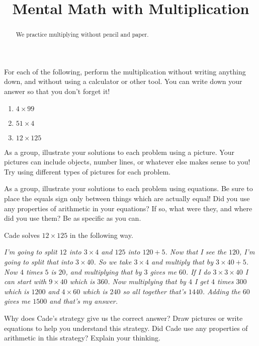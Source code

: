 \documentclass{ximera}
\title{Mental Math with Multiplication}
\begin{document}
\begin{abstract} We practice multiplying without pencil and paper. \end{abstract}
\maketitle


\begin{problem}
For each of the following, perform the multiplication without writing anything down, and without using a calculator or other tool. You can write down your answer so that you don't forget it!

\begin{enumerate}
\item $4 \times 99$
\item $51 \times 4$
\item $12 \times 125$

\end{enumerate}

\end{problem}


\begin{problem}
As a group, illustrate your solutions to each problem using a picture. Your pictures can include objects, number lines, or whatever else makes sense to you! Try using different types of pictures for each problem.
\end{problem}


\begin{problem}
As a group, illustrate your solutions to each problem using equations. Be sure to place the equals sign only between things which are actually equal! Did you use any properties of arithmetic in your equations? If so, what were they, and where did you use them? Be as specific as you can.

\end{problem}


\begin{problem}
Cade solves $12 \times 125$ in the following way. 

\emph{I'm going to split $12$ into $3 \times 4$ and $125$ into $120 + 5$. Now that I see the $120$, I'm going to split that into $3 \times 40$. So we take $3 \times 4$ and multiply that by $3 \times 40 + 5$. Now $4$ times $5$ is $20$, and multiplying that by $3$ gives me $60$. If I do $3 \times 3 \times 40$ I can start with $9 \times 40$ which is $360$. Now multiplying that by $4$ I get $4$ times $300$ which is $1200$ and $4 \times 60$ which is $240$ so all together that's $1440$. Adding the $60$ gives me $1500$ and that's my answer.}

Why does Cade's strategy give us the correct answer? Draw pictures or write equations to help you understand this strategy. Did Cade use any properties of arithmetic in this strategy?  Explain your thinking.
\end{problem}
\end{document}
